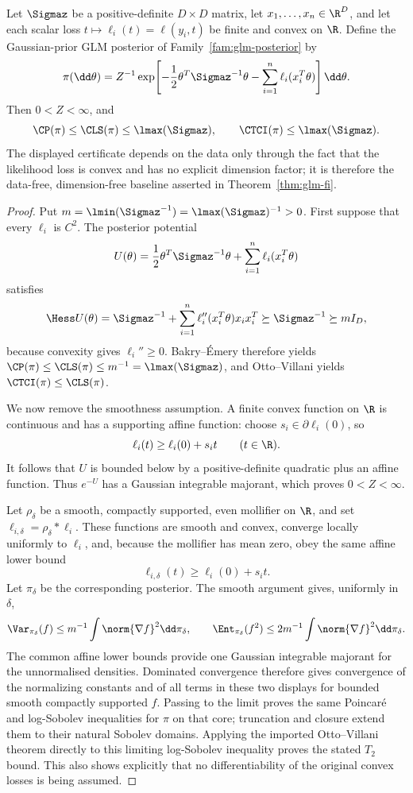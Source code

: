 \documentclass[../main.tex]{subfiles}
\begin{document}
\begin{theorem}
\label{thm:sol-glm-fi}
Let \(\Sigmaz\) be a positive-definite \(D\times D\) matrix, let
\(x_1,\ldots,x_n\in\R^D\), and let each scalar loss
\(t\mapsto\ell_i(t)=\ell(y_i,t)\) be finite and convex on \(\R\).  Define the
Gaussian-prior GLM posterior of Family~\ref{fam:glm-posterior} by
\[
 \pi(\dd\theta)=Z^{-1}\exp\!\left[-\frac12\theta^T\Sigmaz^{-1}\theta
              -\sum_{i=1}^n\ell_i(x_i^T\theta)\right]\dd\theta .
\]
Then \(0<Z<\infty\), and
\[
 \CP(\pi)\le\CLS(\pi)\le\lmax(\Sigmaz),
 \qquad
 \CTCI(\pi)\le\lmax(\Sigmaz).
\]
The displayed certificate depends on the data only through the fact that the likelihood loss is
convex and has no explicit dimension factor; it is therefore the data-free, dimension-free
baseline asserted in Theorem~\ref{thm:glm-fi}.
\end{theorem}

\begin{proof}
Put \(m=\lmin(\Sigmaz^{-1})=\lmax(\Sigmaz)^{-1}>0\).  First suppose that every
\(\ell_i\) is \(C^2\).  The posterior potential
\[
 U(\theta)=\frac12\theta^T\Sigmaz^{-1}\theta+
           \sum_{i=1}^n\ell_i(x_i^T\theta)
\]
satisfies
\[
 \Hess U(\theta)=\Sigmaz^{-1}+
 \sum_{i=1}^n\ell_i''(x_i^T\theta)x_ix_i^T
 \succeq\Sigmaz^{-1}\succeq mI_D,
\]
because convexity gives \(\ell_i''\ge0\).  Bakry--\'Emery therefore yields
\(\CP(\pi)\le\CLS(\pi)\le m^{-1}=\lmax(\Sigmaz)\), and Otto--Villani yields
\(\CTCI(\pi)\le\CLS(\pi)\).

We now remove the smoothness assumption.  A finite convex function on \(\R\) is continuous and
has a supporting affine function: choose \(s_i\in\partial\ell_i(0)\), so
\[
 \ell_i(t)\ge \ell_i(0)+s_it\qquad(t\in\R).
\]
It follows that \(U\) is bounded below by a positive-definite quadratic plus an affine function.
Thus \(e^{-U}\) has a Gaussian integrable majorant, which proves \(0<Z<\infty\).

Let \(\rho_\delta\) be a smooth, compactly supported, even mollifier on \(\R\), and set
\(\ell_{i,\delta}=\rho_\delta*\ell_i\).  These functions are smooth and convex, converge
locally uniformly to \(\ell_i\), and, because the mollifier has mean zero, obey the same affine
lower bound
\[
 \ell_{i,\delta}(t)\ge \ell_i(0)+s_it.
\]
Let \(\pi_\delta\) be the corresponding posterior.  The smooth argument gives, uniformly in
\(\delta\),
\[
 \Var_{\pi_\delta}(f)\le m^{-1}\int\norm{\nabla f}^2\dd\pi_\delta,
 \qquad
 \Ent_{\pi_\delta}(f^2)\le2m^{-1}\int\norm{\nabla f}^2\dd\pi_\delta.
\]
The common affine lower bounds provide one Gaussian integrable majorant for the unnormalised
densities.  Dominated convergence therefore gives convergence of the normalizing constants and
of all terms in these two displays for bounded smooth compactly supported \(f\).  Passing to the
limit proves the same Poincar\'e and log-Sobolev inequalities for \(\pi\) on that core; truncation
and closure extend them to their natural Sobolev domains.  Applying the imported Otto--Villani
theorem directly to this limiting log-Sobolev inequality proves the stated \(T_2\) bound.  This
also shows explicitly that no differentiability of the original convex losses is being assumed.
\end{proof}
\end{document}

